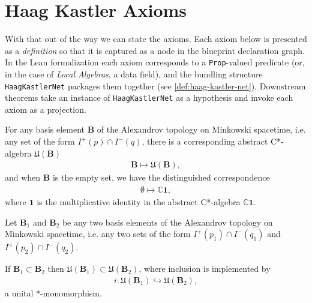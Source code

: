 \section{Haag Kastler Axioms}\label{sctn:haag-kastler-axioms}
With that out of the way we can state the axioms. Each axiom below is presented as a \emph{definition} so that it is captured as a node in the blueprint declaration graph. In the Lean formalization each axiom corresponds to a \texttt{Prop}-valued predicate (or, in the case of \emph{Local Algebras}, a data field), and the bundling structure \texttt{HaagKastlerNet} packages them together (see \ref{def:haag-kastler-net}). Downstream theorems take an instance of \texttt{HaagKastlerNet} as a hypothesis and invoke each axiom as a projection.

\begin{definition}
    \label{def:local-algebras}
    \leanok
    For any basis element $\mathbf{B}$ of the Alexandrov topology on Minkowski spacetime, i.e. any set of the form $I^+(p) \cap I^-(q)$, there is a corresponding abstract C*-algebra $\mathfrak{U}(\mathbf{B})$
    \begin{align}
        \mathbf{B} \longmapsto \mathfrak{U}(\mathbf{B}),
    \end{align}
    and when $\mathbf{B}$ is the empty set, we have the distinguished correspondence
    \begin{align}
        \emptyset \longmapsto \mathbb{C} \mathbf{1},
    \end{align}
    where $\mathbf{1}$ is the multiplicative identity in the abstract C*-algebra $\mathbb{C} \mathbf{1}$.
\end{definition}

\begin{definition}
    \label{def:isotony}
    \leanok
    Let $\mathbf{B}_1$ and $\mathbf{B}_2$ be any two basis elements of the Alexandrov topology on Minkowski spacetime, i.e. any two sets of the form $I^+(p_1) \cap I^-(q_1)$ and $I^+(p_2) \cap I^-(q_2)$.

    If $\mathbf{B}_1 \subset \mathbf{B}_2$ then $\mathfrak{U}(\mathbf{B}_1) \subset \mathfrak{U}(\mathbf{B}_2)$, where inclusion is implemented by
    \begin{align}
        i : \mathfrak{U}(\mathbf{B}_1) \hookrightarrow \mathfrak{U}(\mathbf{B}_2),
    \end{align}
    a unital *-monomorphism.
\end{definition}

